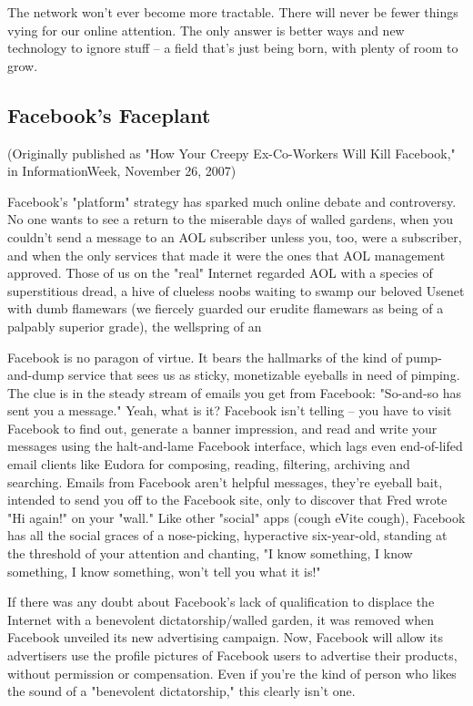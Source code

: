The network won't ever become more tractable. There will never be
fewer things vying for our online attention. The only answer is
better ways and new technology to ignore stuff -- a field that's
just being born, with plenty of room to grow.

\subsection{Facebook's Faceplant}

(Originally published as "How Your Creepy Ex-Co-Workers Will Kill
Facebook," in InformationWeek, November 26, 2007)

Facebook's "platform" strategy has sparked much online debate and
controversy. No one wants to see a return to the miserable days of
walled gardens, when you couldn't send a message to an AOL
subscriber unless you, too, were a subscriber, and when the only
services that made it were the ones that AOL management approved.
Those of us on the "real" Internet regarded AOL with a species of
superstitious dread, a hive of clueless noobs waiting to swamp our
beloved Usenet with dumb flamewars (we fiercely guarded our erudite
flamewars as being of a palpably superior grade), the wellspring of
an

Facebook is no paragon of virtue. It bears the hallmarks of the
kind of pump-and-dump service that sees us as sticky, monetizable
eyeballs in need of pimping. The clue is in the steady stream of
emails you get from Facebook: "So-and-so has sent you a message."
Yeah, what is it? Facebook isn't telling -- you have to visit
Facebook to find out, generate a banner impression, and read and
write your messages using the halt-and-lame Facebook interface,
which lags even end-of-lifed email clients like Eudora for
composing, reading, filtering, archiving and searching. Emails from
Facebook aren't helpful messages, they're eyeball bait, intended to
send you off to the Facebook site, only to discover that Fred wrote
"Hi again!" on your "wall." Like other "social" apps (cough eVite
cough), Facebook has all the social graces of a nose-picking,
hyperactive six-year-old, standing at the threshold of your
attention and chanting, "I know something, I know something, I know
something, won't tell you what it is!"

If there was any doubt about Facebook's lack of qualification to
displace the Internet with a benevolent dictatorship/walled garden,
it was removed when Facebook unveiled its new advertising campaign.
Now, Facebook will allow its advertisers use the profile pictures
of Facebook users to advertise their products, without permission
or compensation. Even if you're the kind of person who likes the
sound of a "benevolent dictatorship," this clearly isn't one.

